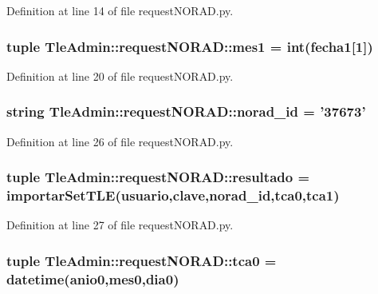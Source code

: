 \-Definition at line 14 of file request\-N\-O\-R\-A\-D.\-py.

\subsubsection[{mes1}]{\setlength{\rightskip}{0pt plus 5cm}tuple {\bf \-Tle\-Admin\-::request\-N\-O\-R\-A\-D\-::mes1} = int({\bf fecha1}[1])}\label{namespace_tle_admin_1_1request_n_o_r_a_d_a017e5869892b9bc0b3388d87997c281b}


\-Definition at line 20 of file request\-N\-O\-R\-A\-D.\-py.

\subsubsection[{norad\-\_\-id}]{\setlength{\rightskip}{0pt plus 5cm}string {\bf \-Tle\-Admin\-::request\-N\-O\-R\-A\-D\-::norad\-\_\-id} = '37673'}\label{namespace_tle_admin_1_1request_n_o_r_a_d_a23f2f8d8dfb22540a9c1368000697dac}


\-Definition at line 26 of file request\-N\-O\-R\-A\-D.\-py.

\subsubsection[{resultado}]{\setlength{\rightskip}{0pt plus 5cm}tuple {\bf \-Tle\-Admin\-::request\-N\-O\-R\-A\-D\-::resultado} = importar\-Set\-T\-L\-E({\bf usuario},{\bf clave},{\bf norad\-\_\-id},{\bf tca0},{\bf tca1})}\label{namespace_tle_admin_1_1request_n_o_r_a_d_af5f55602db24a76953b38e79379ea25a}


\-Definition at line 27 of file request\-N\-O\-R\-A\-D.\-py.

\subsubsection[{tca0}]{\setlength{\rightskip}{0pt plus 5cm}tuple {\bf \-Tle\-Admin\-::request\-N\-O\-R\-A\-D\-::tca0} = datetime({\bf anio0},{\bf mes0},{\bf dia0})}\label{namespace_tle_admin_1_1request_n_o_r_a_d_a56f7b53dfda9de64dcfea8d83c48d5bd}


